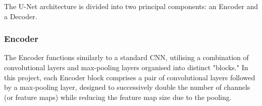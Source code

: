 \documentclass[12pt]{article}
\begin{document}














The U-Net architecture is divided into two principal components: an Encoder and a Decoder. 

\subsubsection*{Encoder}


The Encoder functions similarly to a standard CNN, utilising a combination of convolutional layers and max-pooling layers organised into distinct "blocks." In this project, each Encoder block comprises a pair of convolutional layers followed by a max-pooling layer, designed to successively double the number of channels (or feature maps) while 
reducing the feature map size due to the pooling.
\end{document}
